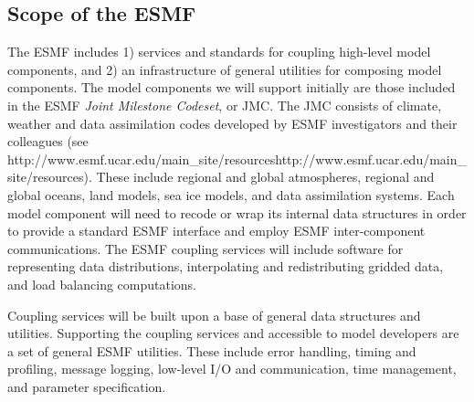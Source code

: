 \subsection{Scope of the ESMF}

The ESMF includes 1) services and standards for coupling high-level model components,
and 2) an infrastructure of general utilities for composing model components.  The model
components we will support initially are those included in the ESMF {\it Joint Milestone Codeset}, 
or JMC.  The JMC consists of climate, weather and data assimilation codes developed by 
ESMF investigators and their colleagues (see \htmladdnormallink
{http://www.esmf.ucar.edu/main\_site/resources}{http://www.esmf.ucar.edu/main\_site/resources}).  
These include regional and global atmospheres, regional and global oceans, land models, 
sea ice models, and data assimilation 
systems.  Each model component will need to recode or wrap its internal data structures in 
order to provide a standard ESMF interface and employ ESMF inter-component communications.  
The ESMF coupling services will include software for representing data distributions, 
interpolating and redistributing gridded data, and load balancing computations.

Coupling services will be built upon a base of general data structures and utilities.  Supporting the coupling services and accessible to model developers are a set of 
general ESMF utilities.  These include error handling, timing and profiling, 
message logging, low-level I/O and communication, time management, and parameter 
specification.









